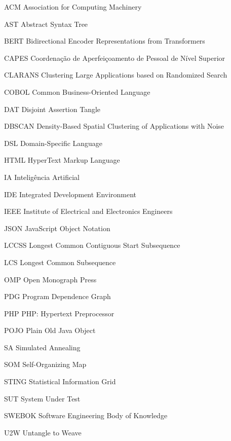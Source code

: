 \begin{siglas}
	\item[ACM] Association for Computing Machinery
	\item[AST] Abstract Syntax Tree
	\item[BERT] Bidirectional Encoder Representations from Transformers
	\item[CAPES] Coordenação de Aperfeiçoamento de Pessoal de Nível Superior
	\item[CLARANS] Clustering Large Applications based on Randomized Search
	\item[COBOL] Common Business-Oriented Language
	\item[DAT] Disjoint Assertion Tangle
	\item[DBSCAN] Density-Based Spatial Clustering of Applications with Noise
	\item[DSL] Domain-Specific Language
	\item[HTML] HyperText Markup Language
	\item[IA] Inteligência Artificial
	\item[IDE] Integrated Development Environment
	\item[IEEE] Institute of Electrical and Electronics Engineers
	\item[JSON] JavaScript Object Notation
	\item[LCCSS] Longest Common Contiguous Start Subsequence
	\item[LCS] Longest Common Subsequence
	\item[OMP] Open Monograph Press
	\item[PDG] Program Dependence Graph
	\item[PHP] PHP: Hypertext Preprocessor
	\item[POJO] Plain Old Java Object
	\item[SA] Simulated Annealing
	\item[SOM] Self-Organizing Map
	\item[STING] Statistical Information Grid
	\item[SUT] System Under Test
	\item[SWEBOK] Software Engineering Body of Knowledge
	\item[U2W] Untangle to Weave
\end{siglas}
